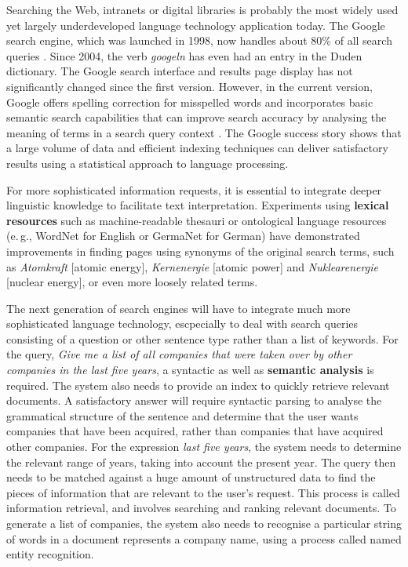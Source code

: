 \documentclass[]{../metanetpaper}
\begin{document}
\begin{multicols}{2}
Searching the Web, intranets or digital libraries is probably the most widely used yet largely underdeveloped language technology application today. The Google search engine, which was launched in 1998, now handles about 80\% of all search queries \cite{spi1}. Since 2004, the verb \textit{googeln} has even had an entry in the Duden dictionary. The Google search interface and results page display has not significantly changed since the first version. However, in the current version, Google offers spelling correction for misspelled words and incorporates basic semantic search capabilities that can improve search accuracy by analysing the meaning of terms in a search query context \cite{pc1}. The Google success story shows that a large volume of data and efficient indexing techniques can deliver satisfactory results using a statistical approach to language processing. 

For more sophisticated information requests, it is essential to integrate deeper linguistic knowledge to facilitate text interpretation. Experiments using \textbf{lexical resources} such as machine-readable thesauri or ontological language resources (e.\,g., WordNet for English or GermaNet for German) have demonstrated improvements in finding pages using synonyms of the original search terms, such as \textit{Atomkraft} {[}atomic energy{]}, \textit{Kernenergie} {[}atomic power{]} and \textit{Nuklearenergie} {[}nuclear energy{]}, or even more loosely related terms.


The next generation of search engines will have to integrate much more sophisticated language technology, escpecially to deal with search queries consisting of a question or other sentence type rather than a list of keywords. For the query, \textit{Give me a list of all companies that were taken over by other companies in the last five years}, a syntactic as well as \textbf{semantic analysis} is required. The system also needs to provide an index to quickly retrieve relevant documents. A satisfactory answer will require syntactic parsing to analyse the grammatical structure of the sentence and determine that the user wants companies that have been acquired, rather than companies that have acquired other companies. For the expression \textit{last five years}, the system needs to determine the relevant range of years, taking into account the present year. The query then needs to be matched against a huge amount of unstructured data to find the pieces of information that are relevant to the user’s request. This process is called information retrieval, and involves searching and ranking relevant documents. To generate a list of companies, the system also needs to recognise a particular string of words in a document represents a company name, using a process called named entity recognition.


\end{multicols}
\end{document}
